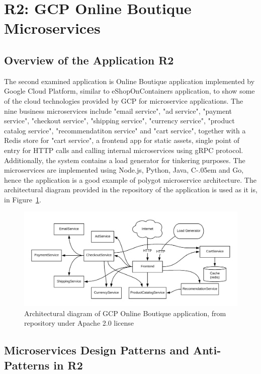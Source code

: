 \documentclass{Configuration_Files/PoliMi3i_thesis}
\newcommand{\Csharp}{%
  {\settoheight{\dimen0}{C}C\kern-.05em \resizebox{!}{\dimen0}{\raisebox{\depth}{\# }}}}
\begin{document}
\section{R2: GCP Online Boutique Microservices}
\label{sec:R2}

\subsection{Overview of the Application R2}
\label{subsec:R2_overview}

The second examined application is Online Boutique application implemented by Google Cloud Platform, similar to eShopOnContainers application, to show some of the cloud technologies provided by GCP for microservice applications.
The nine business microservices include "email service", "ad service", "payment service", "checkout service", "shipping service", "currency service", "product catalog service", "recommendatiton service" and "cart service", together with a Redis store for "cart service", a frontend app for static assets, single point of entry for HTTP calls and calling internal microservices using gRPC protocol.
Additionally, the system contains a load generator for tinkering purposes.
The microservices are implemented using Node.js, Python, Java, \Csharp and Go, hence the application is a good example of polygot microservice architecture.
The architectural diagram provided in the repository of the application is used as it is, in Figure~\ref{fig:R2_arch}.

\begin{figure}[H]
\centering
\includegraphics[width=1\textwidth]{myImages/R2.png}
\caption{Architectural diagram of GCP Online Boutique application, from repository under Apache 2.0 license}
\label{fig:R2_arch}
\end{figure}

\subsection{Microservices Design Patterns and Anti-Patterns in R2}
\label{subsec:R2_detection}
\end{document}
